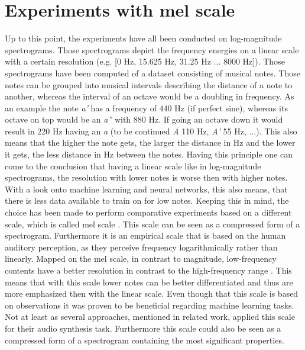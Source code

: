 \section{Experiments with mel scale}
\label{sec:exp_mel}
Up to this point, the experiments have all been conducted on log-magnitude spectrograms. Those spectrograms depict the frequency energies on a linear scale with a certain resolution (e.g. [0 Hz, 15.625 Hz, 31.25 Hz ... 8000 Hz]). Those spectrograms have been computed of a dataset consisting of musical notes. Those notes can be grouped into musical intervals describing the distance of a note to another, whereas the interval of an octave would be a doubling in frequency. As an example the note \textit{a'} has a frequency of 440 Hz (if perfect sine), whereas its octave on top would be an \textit{a''} with 880 Hz. If going an octave down it would result in 220 Hz having an \textit{a} (to be continued \textit{A} 110 Hz, \textit{A'} 55 Hz, ...). This also means that the higher the note gets, the larger the distance in Hz and the lower it gets, the less distance in Hz between the notes. Having this principle one can come to the conclusion that having a linear scale like in log-magnitude spectrograms, the resolution with lower notes is worse then with higher notes. With a look onto machine learning and neural networks, this also means, that there is less data available to train on for low notes.
Keeping this in mind, the choice has been made to perform comparative experiments based on a different scale, which is called mel scale \cite{stevens1937scale}. This scale can be seen as a compressed form of a spectrogram. Furthermore it is an empirical scale that is based on the human auditory perception, as they perceive frequency logarithmically rather than linearly. Mapped on the mel scale, in contrast to magnitude, low-frequency contents have a better resolution in contrast to the high-frequency range \cite{Kathania2019}. This means that with this scale lower notes can be better differentiated and thus are more emphasized then with the linear scale. Even though that this scale is based on observations it was proven to be beneficial regarding machine learning tasks. Not at least as several approaches, mentioned in related work, applied this scale for their audio synthesis task. Furthermore this scale could also be seen as a compressed form of a spectrogram containing the most significant properties. 

